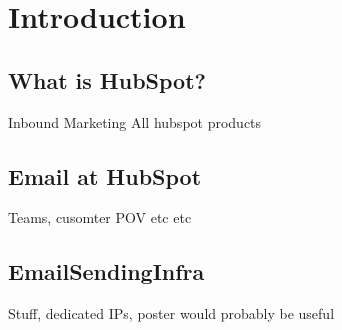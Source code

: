 \chapter{Introduction}

\section{What is HubSpot?}
Inbound Marketing
All hubspot products

\section{Email at HubSpot}
Teams, cusomter POV etc etc

\section{EmailSendingInfra} \label{sec:emailSendingInfra}
Stuff, dedicated IPs, poster would probably be useful